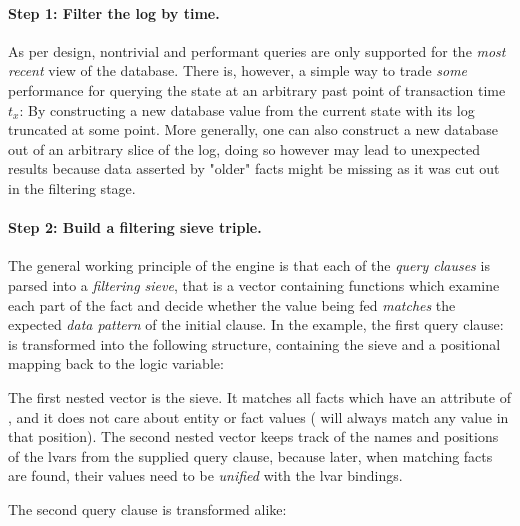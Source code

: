 \paragraph{Step 1: Filter the log by time.}
As per design, nontrivial and performant queries are only supported for the \emph{most recent} view of the database. There is, however, a simple way to trade \emph{some} performance for querying the state at an arbitrary past point of transaction time $t_x$: By constructing a new database value from the current state with its log truncated at some point. More generally, one can also construct a new database out of an arbitrary slice of the log, doing so however may lead to unexpected results because data asserted by "older" facts might be missing as it was cut out in the filtering stage.

\paragraph{Step 2: Build a filtering sieve triple.}

The general working principle of the engine is that each of the \emph{query clauses} is parsed into a \emph{filtering sieve}, that is a vector containing functions which examine each part of the fact and decide whether the value being fed \emph{matches} the expected \emph{data pattern} of the initial clause. In the example, the first query clause:  is transformed into the following structure, containing the sieve and a positional mapping back to the logic variable:

\begin{center}
  \lisp{\{:sieve [true #(= \% :name) true] :lvars ["?e" nil "?name"]]\}}
\end{center}

The first nested vector is the sieve. It matches all facts which have an attribute of , and it does not care about entity or fact values ( will always match any value in that position). The second nested vector keeps track of the names and positions of the lvars from the supplied query clause, because later, when matching facts are found, their values need to be \emph{unified} with the lvar bindings.

\cleardoublepage
The second query clause is transformed alike:

\begin{center}
   \\
  \lisp{\{:sieve [true #(= \% :room) #(= \% :room/32)] :lvars ["?e" nil nil]]\}}
\end{center}

